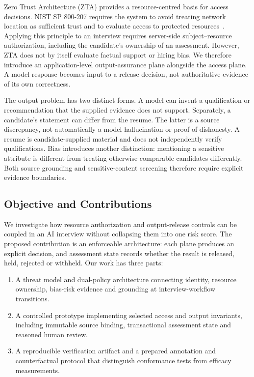 \documentclass[conference]{IEEEtran}
\begin{document}
Zero Trust Architecture (ZTA) provides a resource-centred basis for access decisions. NIST SP 800-207 requires the system to avoid treating network location as sufficient trust and to evaluate access to protected resources~\cite{rose2020zero}. Applying this principle to an interview requires server-side subject--resource authorization, including the candidate's ownership of an assessment. However, ZTA does not by itself evaluate factual support or hiring bias. We therefore introduce an application-level output-assurance plane alongside the access plane. A model response becomes input to a release decision, not authoritative evidence of its own correctness.

The output problem has two distinct forms. A model can invent a qualification or recommendation that the supplied evidence does not support. Separately, a candidate's statement can differ from the resume. The latter is a source discrepancy, not automatically a model hallucination or proof of dishonesty. A resume is candidate-supplied material and does not independently verify qualifications. Bias introduces another distinction: mentioning a sensitive attribute is different from treating otherwise comparable candidates differently. Both source grounding and sensitive-content screening therefore require explicit evidence boundaries.

\subsection{Objective and Contributions}
We investigate how resource authorization and output-release controls can be coupled in an AI interview without collapsing them into one risk score. The proposed contribution is an enforceable architecture: each plane produces an explicit decision, and assessment state records whether the result is released, held, rejected or withheld. Our work has three parts:
\begin{enumerate}
\item A threat model and dual-policy architecture connecting identity, resource ownership, bias-risk evidence and grounding at interview-workflow transitions.
\item A controlled prototype implementing selected access and output invariants, including immutable source binding, transactional assessment state and reasoned human review.
\item A reproducible verification artifact and a prepared annotation and counterfactual protocol that distinguish conformance tests from efficacy measurements.
\end{enumerate}
\end{document}
